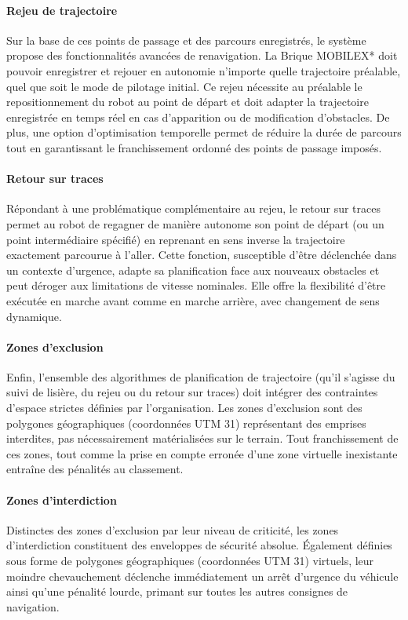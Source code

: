 \paragraph{Rejeu de trajectoire}
Sur la base de ces points de passage et des parcours enregistrés, le système propose des fonctionnalités avancées de renavigation. La Brique MOBILEX* doit pouvoir enregistrer et rejouer en autonomie n'importe quelle trajectoire préalable, quel que soit le mode de pilotage initial. Ce rejeu nécessite au préalable le repositionnement du robot au point de départ et doit adapter la trajectoire enregistrée en temps réel en cas d'apparition ou de modification d'obstacles. De plus, une option d'optimisation temporelle permet de réduire la durée de parcours tout en garantissant le franchissement ordonné des points de passage imposés.

\paragraph{Retour sur traces}
Répondant à une problématique complémentaire au rejeu, le retour sur traces permet au robot de regagner de manière autonome son point de départ (ou un point intermédiaire spécifié) en reprenant en sens inverse la trajectoire exactement parcourue à l'aller. Cette fonction, susceptible d'être déclenchée dans un contexte d'urgence, adapte sa planification face aux nouveaux obstacles et peut déroger aux limitations de vitesse nominales. Elle offre la flexibilité d'être exécutée en marche avant comme en marche arrière, avec changement de sens dynamique.

\paragraph{Zones d'exclusion}
Enfin, l'ensemble des algorithmes de planification de trajectoire (qu'il s'agisse du suivi de lisière, du rejeu ou du retour sur traces) doit intégrer des contraintes d'espace strictes définies par l'organisation. Les zones d'exclusion sont des polygones géographiques (coordonnées UTM 31) représentant des emprises interdites, pas nécessairement matérialisées sur le terrain. Tout franchissement de ces zones, tout comme la prise en compte erronée d'une zone virtuelle inexistante entraîne des pénalités au classement.

\paragraph{Zones d'interdiction}
Distinctes des zones d'exclusion par leur niveau de criticité, les zones d'interdiction constituent des enveloppes de sécurité absolue. Également définies sous forme de polygones géographiques (coordonnées UTM 31) virtuels, leur moindre chevauchement déclenche immédiatement un arrêt d'urgence du véhicule ainsi qu'une pénalité lourde, primant sur toutes les autres consignes de navigation.

